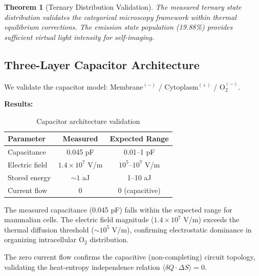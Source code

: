 \documentclass[twocolumn,10pt]{article}
\newtheorem{theorem}{Theorem}[section]
\begin{document}
\begin{theorem}[Ternary Distribution Validation]
The measured ternary state distribution validates the categorical microscopy framework within thermal equilibrium corrections. The emission state population (19.88\%) provides sufficient virtual light intensity for self-imaging.
\end{theorem}

\subsection{Three-Layer Capacitor Architecture}

We validate the capacitor model: Membrane$^{(-)}$ / Cytoplasm$^{(+)}$ / O$_2^{(-)}$.

\textbf{Results:}
\begin{table}[H]
\centering
\caption{Capacitor architecture validation}
\begin{tabular}{@{}lcc@{}}
\toprule
Parameter & Measured & Expected Range \\
\midrule
Capacitance & 0.045 pF & 0.01--1 pF \\
Electric field & $1.4 \times 10^7$ V/m & $10^5$--$10^7$ V/m \\
Stored energy & $\sim 1$ aJ & 1--10 aJ \\
Current flow & 0 & 0 (capacitive) \\
\bottomrule
\end{tabular}
\end{table}

The measured capacitance (0.045 pF) falls within the expected range for mammalian cells. The electric field magnitude ($1.4 \times 10^7$ V/m) exceeds the thermal diffusion threshold ($\sim 10^5$ V/m), confirming electrostatic dominance in organizing intracellular O$_2$ distribution.

The zero current flow confirms the capacitive (non-completing) circuit topology, validating the heat-entropy independence relation $\langle \delta Q \cdot \Delta S \rangle = 0$.
\end{document}
